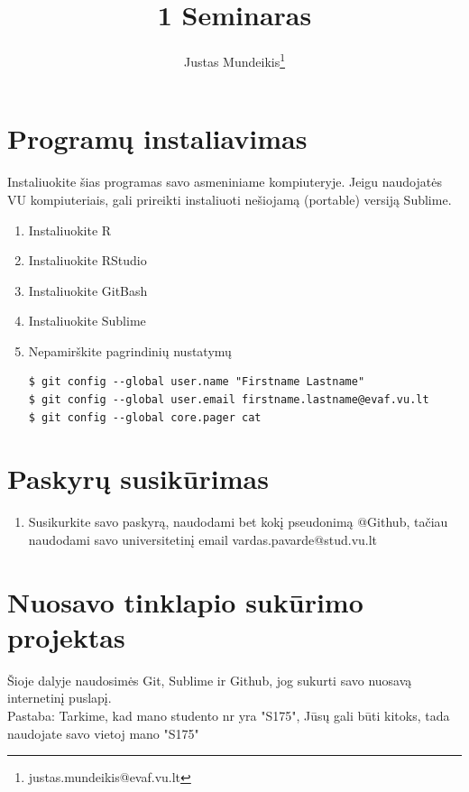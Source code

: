 \documentclass[11pt,a4paper]{article}
\author{Justas Mundeikis\thanks{justas.mundeikis@evaf.vu.lt}}
\title{1 Seminaras}
\begin{document}
\maketitle
\section{Programų instaliavimas}
Instaliuokite šias programas savo asmeniniame kompiuteryje. Jeigu naudojatės VU kompiuteriais, gali prireikti instaliuoti nešiojamą (portable) versiją Sublime.

\begin{enumerate}
\item Instaliuokite R
\item Instaliuokite RStudio
\item Instaliuokite GitBash
\item Instaliuokite Sublime
\item Nepamirškite pagrindinių nustatymų
\begin{lstlisting}
$ git config --global user.name "Firstname Lastname"
$ git config --global user.email firstname.lastname@evaf.vu.lt
$ git config --global core.pager cat 
\end{lstlisting}
\end{enumerate}

\section{Paskyrų susikūrimas}
\begin{enumerate}
\item Susikurkite savo paskyrą, naudodami bet kokį pseudonimą @Github, tačiau naudodami savo universitetinį email vardas.pavarde@stud.vu.lt
\end{enumerate}

\section{Nuosavo tinklapio sukūrimo projektas}
Šioje dalyje naudosimės Git, Sublime ir Github, jog sukurti savo nuosavą internetinį puslapį. 
\\Pastaba: Tarkime, kad mano studento nr yra "S175", Jūsų gali būti kitoks, tada naudojate savo vietoj mano "S175"
\end{document}
